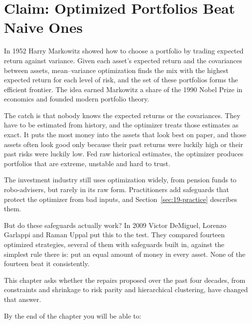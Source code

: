 \chapter{Claim: Optimized Portfolios Beat Naive Ones}
\label{ch:19}

In 1952 Harry Markowitz showed how to choose a portfolio by trading expected return against variance. Given each asset's expected return and the covariances between assets, mean--variance optimization finds the mix with the highest expected return for each level of risk, and the set of these portfolios forms the efficient frontier. The idea earned Markowitz a share of the 1990 Nobel Prize in economics and founded modern portfolio theory.

The catch is that nobody knows the expected returns or the covariances. They have to be estimated from history, and the optimizer treats those estimates as exact. It puts the most money into the assets that look best on paper, and those assets often look good only because their past returns were luckily high or their past risks were luckily low. Fed raw historical estimates, the optimizer produces portfolios that are extreme, unstable and hard to trust.

The investment industry still uses optimization widely, from pension funds to robo-advisers, but rarely in its raw form. Practitioners add safeguards that protect the optimizer from bad inputs, and Section~\ref{sec:19-practice} describes them.

But do these safeguards actually work? In 2009 Victor DeMiguel, Lorenzo Garlappi and Raman Uppal put this to the test. They compared fourteen optimized strategies, several of them with safeguards built in, against the simplest rule there is: put an equal amount of money in every asset.
None of the fourteen beat it consistently.

This chapter asks whether the repairs proposed over the past four decades, from constraints and shrinkage to risk parity and hierarchical clustering, have changed that answer.




By the end of the chapter you will be able to:

